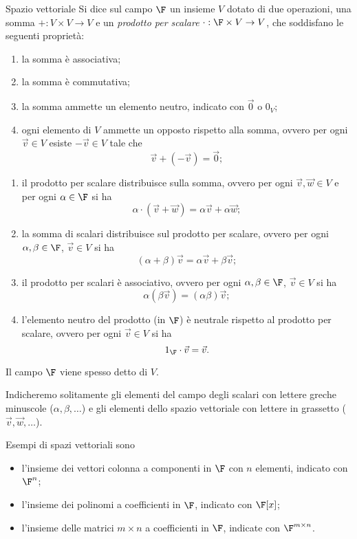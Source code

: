 \begin{definition}
    {Spazio vettoriale}{}
    Si dice  sul campo $\F$ un insieme $V$ dotato di due operazioni, una somma $+ : V \times V \to V$ e un \emph{prodotto per scalare} $\cdot : \F \times V \to V$, che soddisfano le seguenti proprietà: \begin{enumerate}[(S1)]
        \item la somma è associativa;
        \item la somma è commutativa;
        \item la somma ammette un elemento neutro, indicato con $\vec{0}$ o $0_V$;
        \item ogni elemento di $V$ ammette un opposto rispetto alla somma, ovvero per ogni $\vec{v} \in V$ esiste $-\vec v \in V$ tale che \[
            \vec v + (-\vec v) = \vec 0;
        \]
    \end{enumerate} \begin{enumerate}[(P1)]
        \item il prodotto per scalare distribuisce sulla somma, ovvero per ogni $\vec v, \vec w \in V$ e per ogni $\alpha \in \F$ si ha \[
            \alpha \cdot (\vec v + \vec w) = \alpha \vec v + \alpha \vec w;
        \] 
        \item la somma di scalari distribuisce sul prodotto per scalare, ovvero per ogni $\alpha, \beta \in \F$, $\vec v \in V$ si ha \[
            (\alpha + \beta) \vec v = \alpha \vec v + \beta \vec v;
        \] 
        \item il prodotto per scalari è associativo, ovvero per ogni $\alpha, \beta \in \F$, $\vec v \in V$ si ha \[
            \alpha(\beta\vec v) = (\alpha\beta)\vec v;
        \] 
        \item l'elemento neutro del prodotto (in $\F$) è neutrale rispetto al prodotto per scalare, ovvero per ogni $\vec v \in V$ si ha \[
            1_\F \cdot \vec v = \vec v.
        \]
    \end{enumerate} 
    Il campo $\F$ viene spesso detto  di $V$.
\end{definition}

Indicheremo solitamente gli elementi del campo degli scalari con lettere greche minuscole ($\alpha, \beta, \dots$) e gli elementi dello spazio vettoriale con lettere in grassetto ($\vec v, \vec w, \dots$).

Esempi di spazi vettoriali sono \begin{itemize}
    \item l'insieme dei vettori colonna a componenti in $\F$ con $n$ elementi, indicato con $\F^n$; 
    \item l'insieme dei polinomi a coefficienti in $\F$, indicato con $\F[x]$;
    \item l'insieme delle matrici $m \times n$ a coefficienti in $\F$, indicate con $\Mat{\F, m, n}$.   
\end{itemize}


